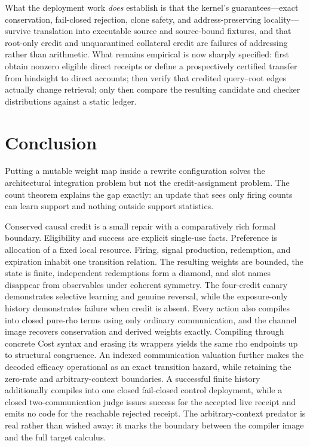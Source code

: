 \documentclass[11pt]{article}
\begin{document}
What the deployment work \emph{does} establish is that the kernel's guarantees---exact
conservation, fail-closed rejection, clone safety, and address-preserving locality---survive
translation into executable source and source-bound fixtures, and that root-only credit
and unquarantined collateral credit are failures of addressing rather than arithmetic.
What remains empirical is now sharply specified: first obtain nonzero eligible direct
receipts or define a prospectively certified transfer from hindsight to direct accounts;
then verify that credited query--root edges actually change retrieval; only then compare
the resulting candidate and checker distributions against a static ledger.

\section{Conclusion}

Putting a mutable weight map inside a rewrite configuration solves the
architectural integration problem but not the credit-assignment problem.  The
count theorem explains the gap exactly: an update that sees only firing counts
can learn support and nothing outside support statistics.

Conserved causal credit is a small repair with a comparatively rich formal
boundary.  Eligibility and success are explicit single-use facts.  Preference
is allocation of a fixed local resource.  Firing, signal production,
redemption, and expiration inhabit one transition relation.  The resulting
weights are bounded, the state is finite, independent redemptions form a
diamond, and slot names disappear from observables under coherent symmetry.
The four-credit canary demonstrates selective learning and genuine reversal,
while the exposure-only history demonstrates failure when credit is absent.
Every action also compiles into closed pure-rho terms using only ordinary
communication, and the channel image recovers conservation and derived
weights exactly.  Compiling through concrete Cost syntax and erasing its
wrappers yields the same rho endpoints up to structural congruence.  An
indexed communication valuation further makes the decoded efficacy
operational as an exact transition hazard, while retaining the zero-rate and
arbitrary-context boundaries.  A successful finite history additionally compiles into one
closed fail-closed control deployment, while a closed two-communication judge
issues success for the accepted live receipt and emits no code for the
reachable rejected receipt.  The arbitrary-context predator is real rather
than wished away: it marks the boundary between the compiler image and the
full target calculus.
\end{document}
